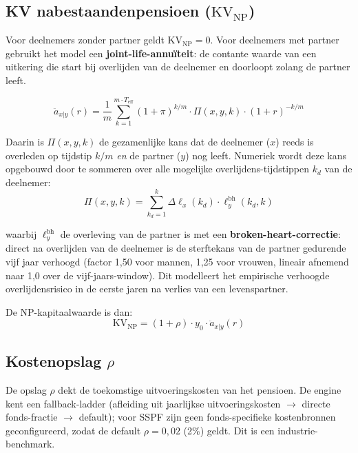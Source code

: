 \documentclass[11pt,a4paper]{article}
\newcommand{\ann}{\ddot{a}}                 %
\newcommand{\bh}{\text{bh}}
\begin{document}
\subsection{KV nabestaandenpensioen ($\text{KV}_{\text{NP}}$)}

Voor deelnemers zonder partner geldt $\text{KV}_{\text{NP}} = 0$. Voor deelnemers met partner gebruikt het model een \textbf{joint-life-annuïteit}: de contante waarde van een uitkering die start bij overlijden van de deelnemer en doorloopt zolang de partner leeft.

\begin{equation}
\ann_{x|y}(r) = \frac{1}{m} \sum_{k=1}^{m \cdot T_{\text{eff}}} (1+\pi)^{k/m} \cdot \Pi(x, y, k) \cdot (1+r)^{-k/m}
\end{equation}

Daarin is $\Pi(x, y, k)$ de gezamenlijke kans dat de deelnemer ($x$) reeds is overleden op tijdstip $k/m$ \emph{en} de partner ($y$) nog leeft. Numeriek wordt deze kans opgebouwd door te sommeren over alle mogelijke overlijdens-tijdstippen $k_d$ van de deelnemer:
\begin{equation}
\Pi(x, y, k) = \sum_{k_d = 1}^{k} \Delta\ell_x(k_d) \cdot \ell_y^{\bh}(k_d, k)
\end{equation}

waarbij $\ell_y^{\bh}$ de overleving van de partner is met een \textbf{broken-heart-correctie}: direct na overlijden van de deelnemer is de sterftekans van de partner gedurende vijf jaar verhoogd (factor 1,50 voor mannen, 1,25 voor vrouwen, lineair afnemend naar 1,0 over de vijf-jaars-window). Dit modelleert het empirische verhoogde overlijdensrisico in de eerste jaren na verlies van een levenspartner.

De NP-kapitaalwaarde is dan:
\begin{equation}
\text{KV}_{\text{NP}} = (1 + \rho) \cdot y_0 \cdot \ann_{x|y}(r)
\end{equation}

\subsection{Kostenopslag $\rho$}

De opslag $\rho$ dekt de toekomstige uitvoeringskosten van het pensioen. De engine kent een fallback-ladder (afleiding uit jaarlijkse uitvoeringskosten $\to$ directe fonds-fractie $\to$ default); voor SSPF zijn geen fonds-specifieke kostenbronnen geconfigureerd, zodat de default $\rho = 0{,}02$ (2\%) geldt. Dit is een industrie-benchmark.
\end{document}
